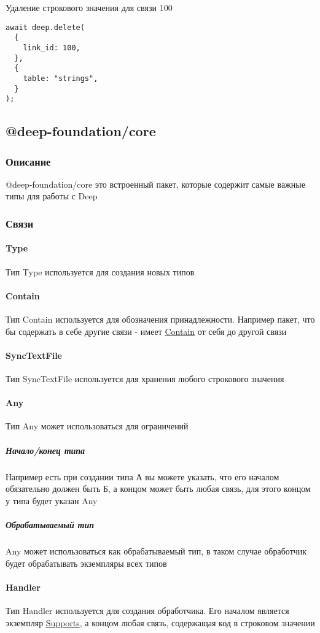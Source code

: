 \documentclass{article}
\begin{document}
Удаление строкового значения для связи 100
\begin{lstlisting}
await deep.delete(
  {
    link_id: 100,
  },
  {
    table: "strings",
  }
);
\end{lstlisting}

\subsection{@deep-foundation/core}
\subsubsection{Описание}
@deep-foundation/core\hypertarget{core.Def}{} это встроенный пакет, которые
содержит самые важные типы для работы с Deep
\subsubsection{Связи}
\paragraph*{Type}
Тип Type\hypertarget{type.Def}{} используется для создания новых типов
\paragraph*{Contain}
Тип Contain\hypertarget{Contain.Def}{} используется для обозначения принадлежности. Например пакет, что бы содержать в себе другие связи - имеет \hyperlink{Contain.Def}{Contain} от себя до другой связи
\paragraph*{SyncTextFile}
Тип SyncTextFile\hypertarget{SyncTextFile.Def}{} используется для хранения
любого строкового значения
\paragraph*{Any}
Тип Any\hypertarget{any.Def}{} может использоваться для ограничений
\subparagraph*{Начало/конец типа}
Например есть при создании типа А вы можете указать, что его началом
обязательно должен быть Б, а концом может быть любая связь, для этого концом у
типа будет указан Any
\subparagraph*{Обрабатываемый тип}
Any может использоваться как обрабатываемый тип, в таком случае обработчик
будет обрабатывать экземпляры всех типов
\paragraph*{Handler}
Тип Handler\hypertarget{handler.Def}{} используется для создания обработчика.
Его началом является экземпляр \hyperlink{supports.Def}{Supports}, а концом
любая связь, содержащая код в строковом значении
\end{document}
